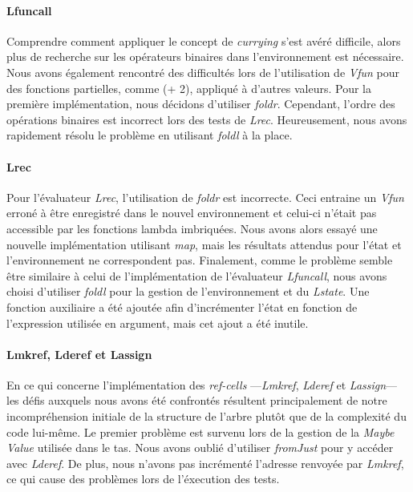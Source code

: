 \documentclass[12pt]{article}
\begin{document}
\paragraph{Lfuncall}
    Comprendre comment appliquer le concept de \textit{currying} s'est avéré difficile, alors plus de recherche sur les opérateurs binaires dans l'environnement est nécessaire. Nous avons également rencontré des difficultés lors de l'utilisation de \textit{Vfun}  pour des fonctions partielles, comme (+ 2), appliqué à d'autres valeurs. Pour la première implémentation, nous décidons d'utiliser \textit{foldr}. Cependant, l'ordre des opérations binaires est incorrect lors des tests de \textit{Lrec}. Heureusement, nous avons rapidement résolu le problème en utilisant \textit{foldl} à la place.

\paragraph{Lrec}
    Pour l'évaluateur \textit{Lrec}, l'utilisation de \textit{foldr} est incorrecte. Ceci entraine un \textit{Vfun} erroné à être enregistré dans le nouvel environnement et celui-ci n'était pas accessible par les fonctions lambda imbriquées. Nous avons alors essayé une nouvelle implémentation utilisant \textit{map}, mais les résultats attendus pour l'état et l'environnement ne correspondent pas. Finalement, comme le problème semble être similaire à celui de l'implémentation de l'évaluateur \textit{Lfuncall}, nous avons choisi d'utiliser \textit{foldl} pour la gestion de l'environnement et du \textit{Lstate}. Une fonction auxiliaire a été ajoutée afin d'incrémenter l'état en fonction de l'expression utilisée en argument, mais cet ajout a été inutile.

\paragraph{Lmkref, Lderef et Lassign}
   En ce qui concerne l'implémentation des \textit{ref-cells} —\textit{Lmkref}, \textit{Lderef} et \textit{Lassign}—  les défis auxquels nous avons été confrontés résultent principalement de notre incompréhension initiale de la structure de l'arbre plutôt que de la complexité du code lui-même. Le premier problème est survenu lors de la gestion de la \textit{Maybe Value} utilisée dans le tas. Nous avons oublié d'utiliser \textit{fromJust} pour y accéder avec \textit{Lderef}. De plus, nous n'avons pas incrémenté l'adresse renvoyée par \textit{Lmkref}, ce qui cause des problèmes lors de l'éxecution des tests.
\end{document}
